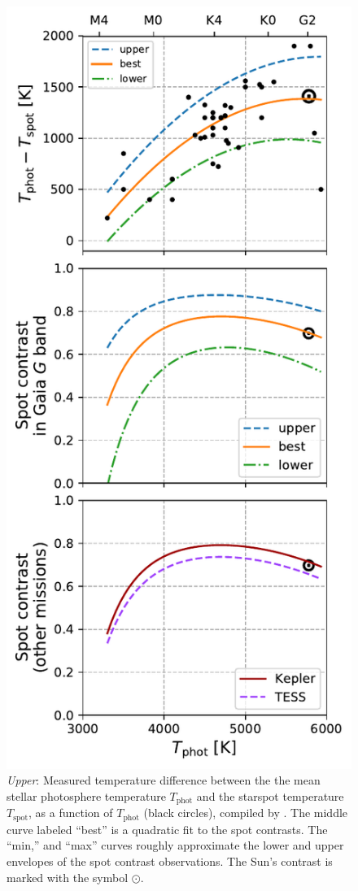 \begin{figure}
\centering
\includegraphics[scale=0.85]{gaia/contrasts.pdf}
\caption{{\sl Upper}: Measured temperature difference between the the mean stellar photosphere temperature $T_{\mathrm{phot}}$ and the starspot temperature $T_{\mathrm{spot}}$, as a function of $T_{\mathrm{phot}}$ (black circles), compiled by \citet{Berdyugina2005}. The middle curve labeled ``best'' is a quadratic fit to the spot contrasts. The  ``min,'' and ``max'' curves roughly approximate the lower and upper envelopes of the spot contrast observations. The Sun's contrast is marked with the symbol $\odot$. 
}
\end{figure}
